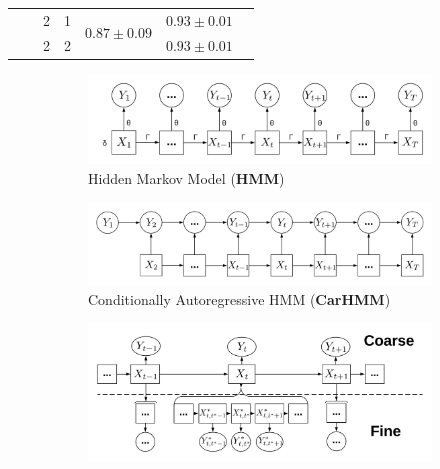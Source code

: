 \begin{table}[ht]
{\begin{tabular}{ccccccc}
                            &                                    & 2                             & 1                                & \multirow{2}{*}{$0.87 \pm 0.09$}    & $0.93 \pm 0.01$                       \\ 
                            &                                    & 2                             & 2                                &                                   & $0.93 \pm 0.01$                       \\ \hline
\end{tabular}
}

\label{table:accuracy}
\end{table}


\begin{figure}[ht]
    \begin{subfigure}{\textwidth}
      \centering
      \includegraphics[width=4in]{../Plots/HMM.png}  
      \caption{Hidden Markov Model (\textbf{HMM})}
      \label{fig:HMM}
    \end{subfigure}
    \newline
    \begin{subfigure}{\textwidth}
      \centering
      \includegraphics[width=4in]{../Plots/CarHMM.png}  
      \caption{Conditionally Autoregressive HMM (\textbf{CarHMM})}
      \label{fig:CarHMM}
    \end{subfigure}
    \newline
    \begin{subfigure}{\textwidth}
      \centering
      \includegraphics[width=4in]{../Plots/HHMM.png}  

\end{subfigure}
\end{figure}
